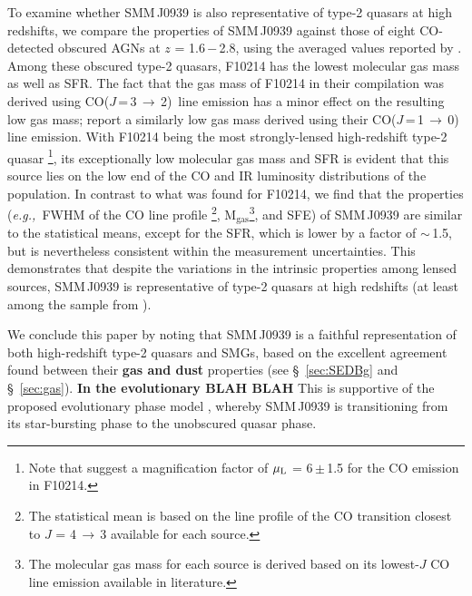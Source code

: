 \documentclass[iop]{emulateapj}
\newcommand{\rarr}{$\rightarrow$}
\newcommand{\CO}{\mbox{CO($J$\,=\,3\,$\rightarrow$\,2) }}
\newcommand{\eg}{{\sl e.g.,~}}
\begin{document}
To examine whether SMM\,J0939 is also representative of type-2 quasars at high redshifts, we compare the properties of SMM\,J0939
against those of eight CO-detected obscured AGNs at $z$ = 1.6\,$-$\,2.8, using the averaged values reported by \citet[][and references
therein]{Polletta11a}. 
Among these obscured type-2 quasars, F10214 has the lowest molecular gas mass as well as SFR. The fact that the gas mass of F10214 in their compilation was derived using \CO line emission \citep{Solomon05a} has a minor effect on the resulting low gas mass; \citet{Riechers11a} report
a similarly low gas mass derived using their CO($J$\,=\,1\,\rarr\,0) line emission.
With F10214 being the most strongly-lensed high-redshift type-2 quasar \citep[$\mu_{\textrm L}$ = 17; ][]{Solomon05a}\footnote{Note that \citet{Deane13a} suggest a magnification factor of $\mu_{\textrm L}$ = 6\,$\pm$\,1.5 for the CO emission in F10214.}, its exceptionally low molecular gas mass and SFR is evident that this source lies on the low end of the CO and IR luminosity distributions of the population.
In contrast to what was found for F10214, we find that the properties
(\eg FWHM of the CO line profile \footnote{The statistical mean is based on the line profile of the CO transition closest to $J$ = 4\,\rarr\,3 available for each source.}, M$_\textrm{gas}$\footnote{The molecular gas mass for each source is derived based on its lowest-$J$ CO line emission available in literature.}, and SFE) of SMM\,J0939 are similar to the statistical means, except for the SFR, which is lower by a
factor of $\sim$\,1.5, but is nevertheless consistent within the measurement uncertainties. This demonstrates that despite the variations in the intrinsic properties among lensed sources,
 SMM\,J0939 is representative of type-2 quasars at high redshifts (at least among the sample from \citealt{Polletta11a}).
 
We conclude this paper by noting that SMM\,J0939 is a faithful representation of both high-redshift type-2 quasars and SMGs,
based on the excellent agreement found between their {\bf gas and dust} properties (see \S~\ref{sec:SEDBg} and \S~\ref{sec:gas}).
{\bf In the evolutionary BLAH BLAH}
This is supportive of the proposed evolutionary phase model \citep[\eg][]{Sanders88,Coppin08a,Simpson12a}, whereby SMM\,J0939 is transitioning from its star-bursting phase to the unobscured quasar phase.
\end{document}
